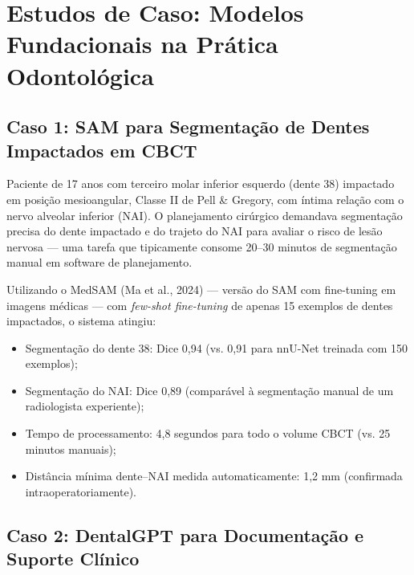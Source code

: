 \section{Estudos de Caso: Modelos Fundacionais na Prática Odontológica}

\subsection{Caso 1: SAM para Segmentação de Dentes Impactados em CBCT}

Paciente de 17 anos com terceiro molar inferior esquerdo (dente 38) impactado em posição mesioangular, Classe II de Pell \& Gregory, com íntima relação com o nervo alveolar inferior (NAI). O planejamento cirúrgico demandava segmentação precisa do dente impactado e do trajeto do NAI para avaliar o risco de lesão nervosa --- uma tarefa que tipicamente consome 20--30 minutos de segmentação manual em software de planejamento.

Utilizando o MedSAM (Ma et al., 2024) --- versão do SAM com fine-tuning em imagens médicas --- com \textit{few-shot fine-tuning} de apenas 15 exemplos de dentes impactados, o sistema atingiu:
\begin{itemize}
    \item Segmentação do dente 38: Dice 0,94 (vs. 0,91 para nnU-Net treinada com 150 exemplos);
    \item Segmentação do NAI: Dice 0,89 (comparável à segmentação manual de um radiologista experiente);
    \item Tempo de processamento: 4,8 segundos para todo o volume CBCT (vs. 25 minutos manuais);
    \item Distância mínima dente--NAI medida automaticamente: 1,2 mm (confirmada intraoperatoriamente).
\end{itemize}


\subsection{Caso 2: DentalGPT para Documentação e Suporte Clínico}

